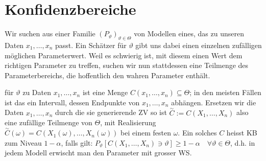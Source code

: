 
\section{Konfidenzbereiche}
Wir suchen aus einer Familie $(P_\vartheta)_{\vartheta \in \Theta}$ von Modellen eines, das zu unseren Daten $x_1, \dots, x_n$ passt. Ein Schätzer für $\vartheta$ gibt uns dabei einen einzelnen zufälligen möglichen Parameterwert. Weil es schwierig ist, mit diesem einen Wert dem richtigen Parameter zu treffen, suchen wir nun stattdessen eine Teilmenge des Parameterbereichs, die hoffentlich den wahren Parameter enthält.
\begin{itemize}
     für $\vartheta$ zu Daten $x_1, \dots, x_n$ ist eine Menge $C(x_1, \dots, x_n) \subseteq \Theta$; in den meisten Fällen ist das ein Intervall, dessen Endpunkte von $x_1, \dots, x_n$ abhängen. Ersetzen wir die Daten $x_1, \dots, x_n$ durch die sie generierende ZV so ist $\overset{\sim}{C} := C(X_1, \dots, X_n)$ also eine zufällige Teilmenge von $\Theta$, mit Realisierung $\overset{\sim}{C}(\omega) = C(X_1(\omega), \dots, X_n(\omega))$ bei einem festen $\omega$. Ein solches $C$ heisst KB zum Niveau $1 - \alpha$, falls gilt: $P_\vartheta[C(X_1, \dots, X_n) \ni \vartheta] \ge 1 - \alpha \quad \forall \vartheta \in \Theta$, d.h. in jedem Modell erwischt man den Parameter mit grosser WS.
\end{itemize}

